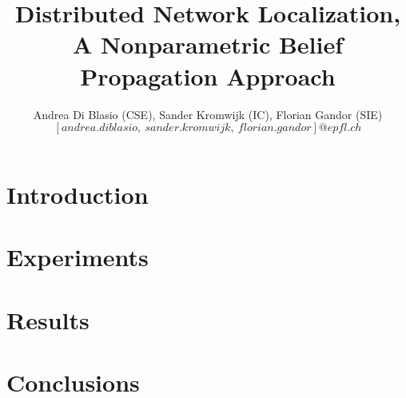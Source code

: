 \documentclass[a4paper, 10pt, conference]{ieeeconf}      %
\title{\LARGE \bf
Distributed Network Localization, A Nonparametric Belief Propagation Approach
}
\author{Andrea Di Blasio (CSE), Sander Kromwijk (IC), Florian Gandor (SIE) \\ $[andrea.diblasio,~sander.kromwijk,~florian.gandor]@epfl.ch$}
\begin{document}
\maketitle
\thispagestyle{empty}
\pagestyle{empty}
\begin{abstract}



\end{abstract}


\section{Introduction}



\section{Experiments}



\section{Results}






\section{Conclusions}








\end{document}
